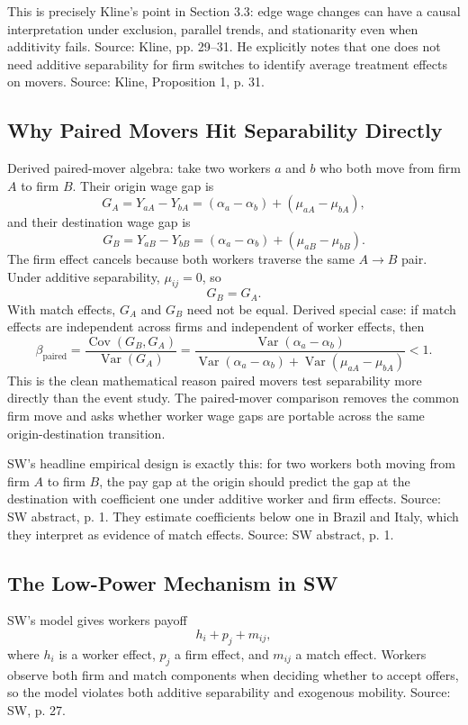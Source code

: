 \documentclass[11pt]{article}
\newcommand{\Var}{\operatorname{Var}}
\newcommand{\Cov}{\operatorname{Cov}}
\begin{document}
This is precisely Kline's point in Section 3.3: edge wage changes can have a
causal interpretation under exclusion, parallel trends, and stationarity even when
additivity fails. Source: Kline, pp. 29--31. He explicitly notes that one does not
need additive separability for firm switches to identify average treatment effects
on movers. Source: Kline, Proposition 1, p. 31.

\subsection{Why Paired Movers Hit Separability Directly}

Derived paired-mover algebra: take two workers $a$ and $b$ who both move from firm $A$ to firm $B$. Their
origin wage gap is
\[
G_A
=
Y_{aA}-Y_{bA}
=
(\alpha_a-\alpha_b)+(\mu_{aA}-\mu_{bA}),
\]
and their destination wage gap is
\[
G_B
=
Y_{aB}-Y_{bB}
=
(\alpha_a-\alpha_b)+(\mu_{aB}-\mu_{bB}).
\]
The firm effect cancels because both workers traverse the same $A\to B$ pair.
Under additive separability, $\mu_{ij}=0$, so
\[
G_B=G_A.
\]
With match effects, $G_A$ and $G_B$ need not be equal. Derived special case: if match effects are
independent across firms and independent of worker effects, then
\[
\beta_{\text{paired}}
=
\frac{\Cov(G_B,G_A)}{\Var(G_A)}
=
\frac{\Var(\alpha_a-\alpha_b)}
{\Var(\alpha_a-\alpha_b)+\Var(\mu_{aA}-\mu_{bA})}
<1.
\]
This is the clean mathematical reason paired movers test separability more
directly than the event study. The paired-mover comparison removes the common
firm move and asks whether worker wage gaps are portable across the same
origin-destination transition.

SW's headline empirical design is exactly this: for two workers both moving from
firm $A$ to firm $B$, the pay gap at the origin should predict the gap at the
destination with coefficient one under additive worker and firm effects. Source:
SW abstract, p. 1. They estimate coefficients below one in Brazil and Italy, which
they interpret as evidence of match effects. Source: SW abstract, p. 1.

\subsection{The Low-Power Mechanism in SW}

SW's model gives workers payoff
\[
h_i+p_j+m_{ij},
\]
where $h_i$ is a worker effect, $p_j$ a firm effect, and $m_{ij}$ a match effect.
Workers observe both firm and match components when deciding whether to accept
offers, so the model violates both additive separability and exogenous mobility.
Source: SW, p. 27.
\end{document}
